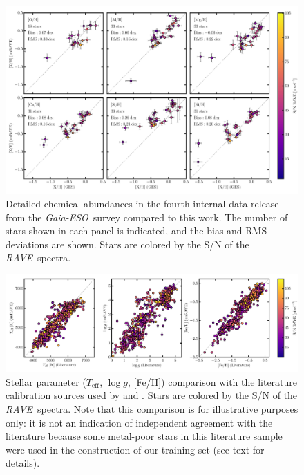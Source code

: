 \documentclass[preprint]{aastex}
\newcommand{\acronym}[1]{{\small{#1}}}
\newcommand{\project}[1]{\textsl{#1}}
\newcommand{\rave}{\project{\acronym{RAVE}}}
\newcommand{\ges}{\project{Gaia-ESO}}
\newcommand{\teff}{T_{\mathrm{eff}}}
\newcommand{\logg}{\log g}
\begin{document}
\begin{figure}[p]
\includegraphics[width=\textwidth]{ges-abundances.pdf}
\caption{Detailed chemical abundances in the fourth internal data release from the \ges\ survey compared to this work.  The number of stars shown in each panel is indicated, and the bias and RMS deviations are shown. Stars are colored by the S/N of the \rave\ spectra.\label{fig:ges-abundances}}
\end{figure}


\begin{figure}[p]
\includegraphics[width=\textwidth]{kordopatis-calibration.pdf}
\caption{Stellar parameter ($\teff$, $\logg$, [Fe/H]) comparison with the literature calibration sources used by \citet{Kordopatis_2013} and \citet{Kunder_2016}. Stars are colored by the S/N of the \rave\ spectra. Note that this comparison is for illustrative purposes only: it is not an indication of independent agreement with the literature because some metal-poor stars in this literature sample were used in the construction of our training set (see text for details).\label{fig:kordopatis-calibration}}
\end{figure}
\end{document}

